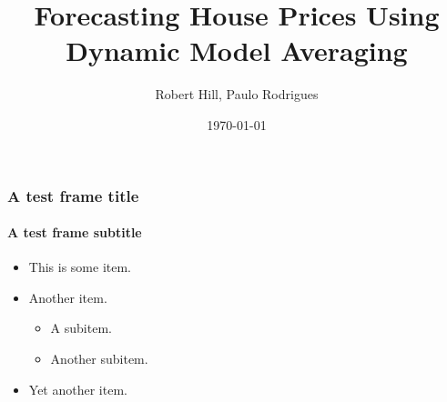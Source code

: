 \documentclass{beamer}
\title[Forecasting House Prices Using Dynamic Model Averaging]{Forecasting House Prices Using Dynamic Model Averaging}
\author{Robert Hill, Paulo Rodrigues}
\date{\today}
\institute{Nova SBE}
\begin{document}
\begin{frame}[plain]
\maketitle
\end{frame}

\begin{frame}
\frametitle{A test frame title}
\framesubtitle{A test frame subtitle}
\begin{itemize}
  \item This is some item.
  \item Another item.
  \begin{itemize}
    \item A subitem.
    \item Another subitem.
  \end{itemize}
  \item Yet another item.
\end{itemize}

\end{frame}
\end{document}
